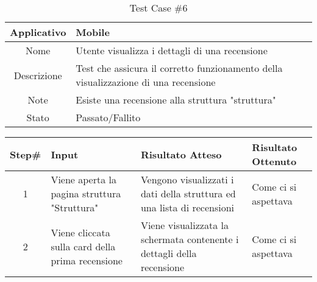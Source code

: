 
\begin{table}[H]
    \centering
    \footnotesize
    \caption{Test Case \#6}
    \begin{tabularx}{\textwidth}{|c|X|}
        \hline
        Applicativo & Mobile\\
        \hline
        Nome & Utente visualizza i dettagli di una recensione  \\
        \hline
        Descrizione & Test che assicura il corretto funzionamento della visualizzazione di una recensione\\
        \hline
        Note & Esiste una recensione alla struttura "struttura"\\
        \hline
        Stato & Passato/Fallito\\
        \hline

    \end{tabularx}
    \setlength{\tabcolsep}{8pt}
    \renewcommand{\arraystretch}{1.5}
\end{table}

\begin{table}[H]
    \footnotesize
    \begin{tabularx}{\textwidth}{|c|X|X|X|}
        \hline
        Step\# & Input & Risultato Atteso & Risultato Ottenuto \\
        \hline
         1 & Viene aperta la pagina struttura "Struttura"
         & Vengono visualizzati i dati della struttura ed una lista di recensioni
         &Come ci si aspettava\\
          \hline
        2 & Viene cliccata sulla card della prima recensione
        & Viene visualizzata la schermata contenente i dettagli della recensione
        & Come ci si aspettava\\
\hline
    \end{tabularx}
\end{table}
    
       
